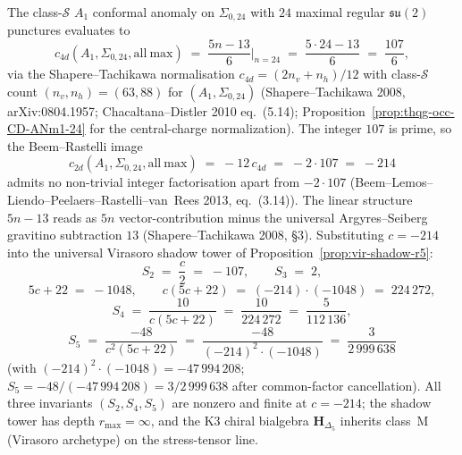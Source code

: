 \begin{proposition}[$c_{2d} = -214$ shadow-tower decomposition;
\ClaimStatusProvedHere]
\label{prop:stqp-312-factor}
The class-$\mathcal S$ $A_1$ conformal anomaly on $\Sigma_{0,24}$
with $24$ maximal regular $\mathfrak{su}(2)$ punctures evaluates to
\[
c_{4d}(A_1, \Sigma_{0,24}, \mathrm{all\ max})
\;=\;
\frac{5n - 13}{6}\bigg|_{n=24}
\;=\;
\frac{5\cdot 24 - 13}{6}
\;=\;
\frac{107}{6},
\]
via the Shapere--Tachikawa normalisation
$c_{4d} = (2n_v + n_h)/12$ with class-$\mathcal S$ count
$(n_v, n_h) = (63, 88)$ for $(A_1, \Sigma_{0,24})$
(Shapere--Tachikawa 2008, arXiv:0804.1957; Chacaltana--Distler 2010
eq.~(5.14); Proposition~\ref{prop:thqg-occ-CD-ANm1-24}
for the central-charge normalization). The integer $107$ is prime, so the Beem--Rastelli
image
\[
c_{2d}(A_1, \Sigma_{0,24}, \mathrm{all\ max})
\;=\;
-12\, c_{4d}
\;=\;
-2\cdot 107
\;=\;
-214
\]
admits no non-trivial integer factorisation apart from $-2\cdot 107$
(Beem--Lemos--Liendo--Peelaers--Rastelli--van~Rees 2013, eq.~(3.14)).
The linear structure $5n - 13$ reads as $5n$ vector-contribution
minus the universal Argyres--Seiberg gravitino subtraction $13$
(Shapere--Tachikawa 2008, \S 3).
Substituting $c = -214$ into the universal Virasoro shadow
tower of Proposition~\ref{prop:vir-shadow-r5}:
\[
S_2 \;=\; \frac{c}{2} \;=\; -107,
\qquad
S_3 \;=\; 2,
\]
\[
5c + 22 \;=\; -1048,
\qquad
c(5c+22) \;=\; (-214)\cdot(-1048) \;=\; 224\,272,
\]
\[
S_4 \;=\; \frac{10}{c(5c+22)} \;=\; \frac{10}{224\,272} \;=\; \frac{5}{112\,136},
\]
\[
S_5 \;=\; \frac{-48}{c^2(5c+22)} \;=\; \frac{-48}{(-214)^2\cdot(-1048)} \;=\; \frac{3}{2\,999\,638}
\]
(with $(-214)^2\cdot(-1048) = -47\,994\,208$;
$S_5 = -48/(-47\,994\,208) = 3/2\,999\,638$ after common-factor
cancellation). All three invariants $(S_2, S_4, S_5)$ are nonzero
and finite at $c = -214$; the shadow tower has depth
$r_{\max} = \infty$, and the K3 chiral bialgebra
$\mathbf H_{\Delta_5}$ inherits class~$\mathrm M$ (Virasoro
archetype) on the stress-tensor line.
\end{proposition}

